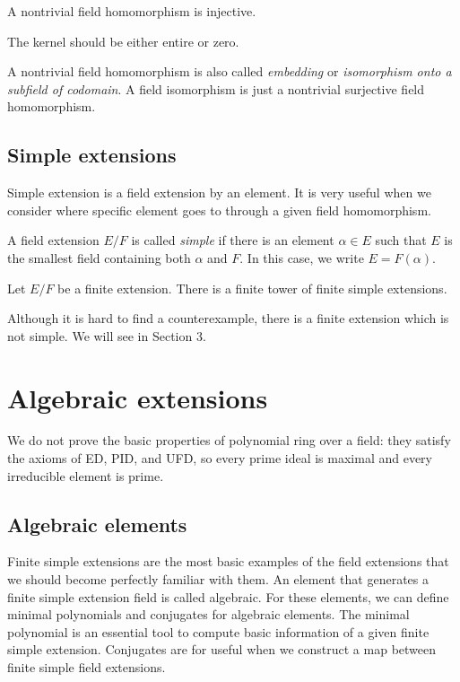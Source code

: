 \documentclass{../exp}
\begin{document}
\begin{prop}
A nontrivial field homomorphism is injective.
\end{prop}
\begin{pf}
The kernel should be either entire or zero.
\end{pf}
A nontrivial field homomorphism is also called \emph{embedding} or \emph{isomorphism onto a subfield of codomain}.
A field isomorphism is just a nontrivial surjective field homomorphism.



\subsection{Simple extensions}
Simple extension is a field extension by an element.
It is very useful when we consider where specific element goes to through a given field homomorphism.

\begin{defn}
A field extension $E/F$ is called \emph{simple} if there is an element $\alpha\in E$ such that $E$ is the smallest field containing both $\alpha$ and $F$.
In this case, we write $E=F(\alpha)$.
\end{defn}

\begin{lem}
Let $E/F$ be a finite extension.
There is a finite tower of finite simple extensions.
\end{lem}

Although it is hard to find a counterexample, there is a finite extension which is not simple.
We will see in Section 3.













\section{Algebraic extensions}

We do not prove the basic properties of polynomial ring over a field: they satisfy the axioms of ED, PID, and UFD, so every prime ideal is maximal and every irreducible element is prime.

\subsection{Algebraic elements}
Finite simple extensions are the most basic examples of the field extensions that we should become perfectly familiar with them.
An element that generates a finite simple extension field is called algebraic.
For these elements, we can define minimal polynomials and conjugates for algebraic elements.
The minimal polynomial is an essential tool to compute basic information of a given finite simple extension.
Conjugates are for useful when we construct a map between finite simple field extensions.
\end{document}
